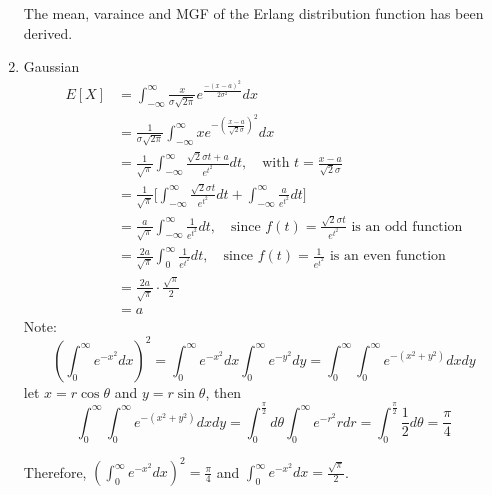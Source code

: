 \documentclass[UTF8]{article}
\begin{document}
\begin{enumerate}
            The mean, varaince and MGF of the Erlang distribution function has been derived.
            \item Gaussian
            \begin{equation*}
                \begin{split}
                    E[X] &= \int_{-\infty}^\infty\frac{x}{\sigma\sqrt{2\pi}}e^{\frac{-(x-a)^2}{2\sigma^2}}dx\\
                    &=\frac{1}{\sigma\sqrt{2\pi}}\int^\infty_{-\infty}xe^{-(\frac{x-a}{\sqrt{2}\sigma})^2}dx \\
                    &=\frac{1}{\sqrt{\pi}}\int^\infty_{-\infty}\frac{\sqrt{2}\sigma t+a}{e^{t^2}}dt,\quad\text{with $t=\frac{x-a}{\sqrt{2}\sigma}$}\\
                    &=\frac{1}{\sqrt{\pi}}\bigg[\int^\infty_{-\infty}\frac{\sqrt{2}\sigma t}{e^{t^2}}dt+\int^\infty_{-\infty}\frac{a}{e^{t^2}}dt\bigg]\\
                    &=\frac{a}{\sqrt{\pi}}\int^\infty_{-\infty}\frac{1}{e^{t^2}}dt,\quad\text{since $f(t)=\frac{\sqrt{2}\sigma t}{e^{t^2}}$ is an odd function}\\
                    &=\frac{2a}{\sqrt{\pi}}\int^\infty_0\frac{1}{e^{t^2}}dt,\quad\text{since $f(t)=\frac{1}{e^{t^2}}$ is an even function}\\
                    &=\frac{2a}{\sqrt{\pi}}\cdot\frac{\sqrt{\pi}}{2}\\
                    &=a
                \end{split}
            \end{equation*}
            Note:
            \begin{equation*}
                (\int^\infty_0e^{-x^2}dx)^2=\int^\infty_0e^{-x^2}dx\int^\infty_0e^{-y^2}dy=\int^\infty_0\int^\infty_0e^{-(x^2+y^2)}dxdy
            \end{equation*}
            let $x=r\cos\theta$ and $y=r\sin\theta$, then
            \begin{equation*}
                \int^\infty_0\int^\infty_0e^{-(x^2+y^2)}dxdy=\int^{\frac{\pi}{2}}_0d\theta\int^\infty_0e^{-r^2}rdr=\int^{\frac{\pi}{2}}_0\frac{1}{2}d\theta=\frac{\pi}{4}
            \end{equation*}
            
            Therefore, $(\int^\infty_0e^{-x^2}dx)^2=\frac{\pi}{4}$ and $\int^\infty_0e^{-x^2}dx=\frac{\sqrt{\pi}}{2}$.


\end{enumerate}
\end{document}
